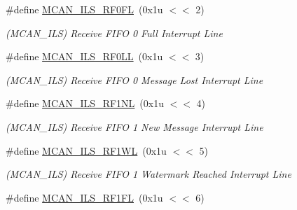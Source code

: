 \begin{DoxyCompactItemize}
\mbox{\label{group__SAMV71__MCAN_ga4775e2f020a416cce85d34b49cfceb5e}} 
\#define \mbox{\hyperlink{group__SAMV71__MCAN_ga4775e2f020a416cce85d34b49cfceb5e}{M\+C\+A\+N\+\_\+\+I\+L\+S\+\_\+\+R\+F0\+FL}}~(0x1u $<$$<$ 2)
\begin{DoxyCompactList}\small\item\em (M\+C\+A\+N\+\_\+\+I\+LS) Receive F\+I\+FO 0 Full Interrupt Line \end{DoxyCompactList}\item 
\mbox{\label{group__SAMV71__MCAN_ga3fd867a29363e15c432d7b6c12a57eac}} 
\#define \mbox{\hyperlink{group__SAMV71__MCAN_ga3fd867a29363e15c432d7b6c12a57eac}{M\+C\+A\+N\+\_\+\+I\+L\+S\+\_\+\+R\+F0\+LL}}~(0x1u $<$$<$ 3)
\begin{DoxyCompactList}\small\item\em (M\+C\+A\+N\+\_\+\+I\+LS) Receive F\+I\+FO 0 Message Lost Interrupt Line \end{DoxyCompactList}\item 
\mbox{\label{group__SAMV71__MCAN_ga3e906d7bb500002b3e311505ddfaf283}} 
\#define \mbox{\hyperlink{group__SAMV71__MCAN_ga3e906d7bb500002b3e311505ddfaf283}{M\+C\+A\+N\+\_\+\+I\+L\+S\+\_\+\+R\+F1\+NL}}~(0x1u $<$$<$ 4)
\begin{DoxyCompactList}\small\item\em (M\+C\+A\+N\+\_\+\+I\+LS) Receive F\+I\+FO 1 New Message Interrupt Line \end{DoxyCompactList}\item 
\mbox{\label{group__SAMV71__MCAN_gabcc622b1b392ffe700a4228106ad7ce8}} 
\#define \mbox{\hyperlink{group__SAMV71__MCAN_gabcc622b1b392ffe700a4228106ad7ce8}{M\+C\+A\+N\+\_\+\+I\+L\+S\+\_\+\+R\+F1\+WL}}~(0x1u $<$$<$ 5)
\begin{DoxyCompactList}\small\item\em (M\+C\+A\+N\+\_\+\+I\+LS) Receive F\+I\+FO 1 Watermark Reached Interrupt Line \end{DoxyCompactList}\item 
\mbox{\label{group__SAMV71__MCAN_ga53cd78808ccd392d7c51804164c5b509}} 
\#define \mbox{\hyperlink{group__SAMV71__MCAN_ga53cd78808ccd392d7c51804164c5b509}{M\+C\+A\+N\+\_\+\+I\+L\+S\+\_\+\+R\+F1\+FL}}~(0x1u $<$$<$ 6)
$$
\end{DoxyCompactItemize}
